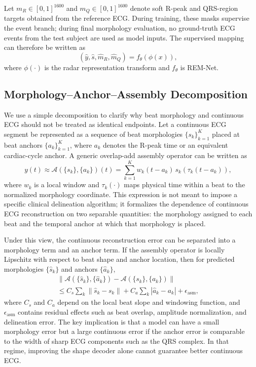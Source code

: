 \documentclass[lettersize,journal]{IEEEtran}
\newcommand{\remnet}{REM-Net\xspace}
\begin{document}
Let $m_R \in [0,1]^{1600}$ and $m_Q \in [0,1]^{1600}$ denote soft R-peak and QRS-region targets obtained from the reference ECG. During training, these masks supervise the event branch; during final morphology evaluation, no ground-truth ECG events from the test subject are used as model inputs. The supervised mapping can therefore be written as
\begin{equation}
    (\hat{y}, \hat{s}, \hat{m}_R, \hat{m}_Q) = f_\theta(\phi(x)),
\end{equation}
where $\phi(\cdot)$ is the radar representation transform and $f_\theta$ is \remnet.

\subsection{Morphology--Anchor--Assembly Decomposition}
We use a simple decomposition to clarify why beat morphology and continuous ECG should not be treated as identical endpoints. Let a continuous ECG segment be represented as a sequence of beat morphologies $\{s_k\}_{k=1}^{K}$ placed at beat anchors $\{a_k\}_{k=1}^{K}$, where $a_k$ denotes the R-peak time or an equivalent cardiac-cycle anchor. A generic overlap-add assembly operator can be written as
\begin{equation}
    y(t) \approx \mathcal{A}(\{s_k\},\{a_k\})(t)
    = \sum_{k=1}^{K} w_k(t-a_k)\,s_k(\tau_k(t-a_k)),
    \label{eq:assembly}
\end{equation}
where $w_k$ is a local window and $\tau_k(\cdot)$ maps physical time within a beat to the normalized morphology coordinate. This expression is not meant to impose a specific clinical delineation algorithm; it formalizes the dependence of continuous ECG reconstruction on two separable quantities: the morphology assigned to each beat and the temporal anchor at which that morphology is placed.

Under this view, the continuous reconstruction error can be separated into a morphology term and an anchor term. If the assembly operator is locally Lipschitz with respect to beat shape and anchor location, then for predicted morphologies $\{\hat{s}_k\}$ and anchors $\{\hat{a}_k\}$,
\begin{equation}
\begin{split}
    \| \mathcal{A}(\{\hat{s}_k\},\{\hat{a}_k\}) -
    \mathcal{A}(\{s_k\},\{a_k\}) \| \\
    \leq C_s \sum_k \|\hat{s}_k-s_k\|
    + C_a \sum_k |\hat{a}_k-a_k|
    + \epsilon_{\mathrm{asm}},
\end{split}
\label{eq:error_decomp}
\end{equation}
where $C_s$ and $C_a$ depend on the local beat slope and windowing function, and $\epsilon_{\mathrm{asm}}$ contains residual effects such as beat overlap, amplitude normalization, and delineation error. The key implication is that a model can have a small morphology error but a large continuous error if the anchor error is comparable to the width of sharp ECG components such as the QRS complex. In that regime, improving the shape decoder alone cannot guarantee better continuous ECG.
\end{document}
